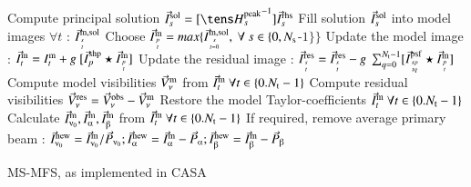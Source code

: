 \documentclass[11pt,a4paper,variablewidth]{article}
\begin{document}
\begin{algorithm}
{{{{          Compute principal solution $\I^{\rm sol}_s = [{\He^{\rm peak}_s}^{-1}] \I^{\rm rhs}_s$\;
          Fill solution ${\vec{I}}^{\rm sol}_s$ into model images $\forall t$ : ${\vec{I}}^{\rm m,sol}_{{s}\atop{t}}$
       }
    }
       Choose ${\vec{I}}^{\rm m}_{{p}\atop{t}} = max\{{\vec{I}}^{\rm m,sol}_{{s}\atop{t=0}},~\forall~s\in\{0,N_{\rm s} $-$1\}\}$ \;
       {
        Update the model image : ${\vec{I}}^{\rm m}_t = I^{\rm m}_t + g ~[ {\vec{I}}^{\rm shp}_{p} \star {\vec{I}}^{\rm m}_{{p}\atop{t}}]$ \;
	{
          Update the residual image : ${\vec{I}}^{\rm res}_{{s}\atop{t}} = {\vec{I}}^{\rm res}_{{s}\atop{t}} - g ~\sum_{q=0}^{N_{\rm t} -1}[{\vec{I}}^{\rm psf}_{{sp}\atop{tq}} \star {\vec{I}}^{\rm m}_{{p}\atop{t}}]$\;
	}
       }
    }
   Compute model visibilities $\vec{V}^{\rm m}_{\nu}$ from  ${\vec{I}}^{\rm m}_t~\forall t\in \{0.N_{\rm t} -1\}$\;
   Compute residual visibilities $\vec{V}^{\rm res}_{\nu} = \vec{V}^{\rm obs}_{\nu}-\vec{V}^{\rm m}_{\nu}$\;
  }
  \vspace{0.5cm} 
Restore the model Taylor-coefficients ${\vec{I}}^{\rm m}_t~\forall t\in \{0.N_{\rm t} -1\}$ \;
Calculate $\vec{I}^{\rm m}_{\nuup_0}, \vec{I}^{\rm m}_{\alphaup}, \vec{I}^{\rm m}_{\betaup}$ from ${\vec{I}}^{\rm m}_t~\forall t\in \{0.N_{\rm t} -1\}$\;
If required, remove average primary beam : $\vec{I}^{\rm new}_{\nuup_0}=\vec{I}^{\rm m}_{\nuup_0}/\vec{P}_{\nuup_0};  \vec{I}^{\rm new}_{\alphaup}=\vec{I}^{\rm m}_{\alphaup}-\vec{P}_{\alphaup};  \vec{I}^{\rm new}_{\betaup}=\vec{I}^{\rm m}_{\betaup}-\vec{P}_{\betaup}$\;

  \caption[MS-MFS Algorithm]
         {MS-MFS, as implemented in CASA}\label{algo:CASA}

\end{algorithm}
\end{document}
